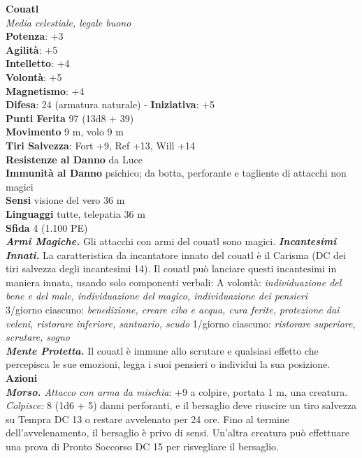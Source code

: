 \begin{multicols}{2}
\medskip\textbf{Couatl}\\
\emph{Media celestiale, legale buono}\\
\textbf{Potenza}: +3\\
\textbf{Agilità}: +5\\
\textbf{Intelletto}: +4\\
\textbf{Volontà}: +5\\
\textbf{Magnetismo}: +4\\
\textbf{Difesa}: 24 (armatura naturale) - \textbf{Iniziativa}: +5\\
\textbf{Punti Ferita} 97 (13d8 + 39)\\
\textbf{Movimento} 9 m, volo 9 m\\
\textbf{Tiri Salvezza}: Fort +9, Ref +13, Will +14\\
\textbf{Resistenze al Danno} da Luce\\
\textbf{Immunità al Danno} psichico; da botta, perforante e tagliente di attacchi non magici\\
\textbf{Sensi} visione del vero 36 m\\
\textbf{Linguaggi} tutte, telepatia 36 m \\
\textbf{Sfida} 4 (1.100 PE)\smallskip\\
\emph{\textbf{Armi Magiche.}} Gli attacchi con armi del couatl sono magici.
\emph{\textbf{Incantesimi Innati.}} La caratteristica da incantatore innato del couatl è il Carisma (DC dei tiri salvezza degli incantesimi 14). Il couatl può lanciare questi incantesimi in maniera innata, usando solo componenti verbali:
A volontà: \emph{individuazione del bene e del male, individuazione del} \emph{magico, individuazione dei pensieri}\\
3/giorno ciascuno: \emph{benedizione, creare cibo e acqua, cura ferite,} \emph{protezione dai veleni, ristorare inferiore, santuario, scudo} 1/giorno ciascuno: \emph{ristorare superiore, scrutare, sogno}\\
\emph{\textbf{Mente Protetta.}} Il couatl è immune allo scrutare e qualsiasi effetto che percepisca le sue emozioni, legga i suoi pensieri o individui la sua posizione.\\
\smallskip\textbf{Azioni}\\
\emph{\textbf{Morso.} Attacco con arma da mischia}: +9 a colpire, portata 1 m, una creatura.\\
\emph{Colpisce:} 8 (1d6 + 5) danni perforanti, e il bersaglio deve riuscire un tiro salvezza su Tempra DC 13 o restare avvelenato per 24 ore. Fino al termine dell'avvelenamento, il bersaglio è privo di sensi. Un'altra creatura può effettuare una prova di Pronto Soccorso DC 15 per risvegliare il bersaglio.\\

\end{multicols}
